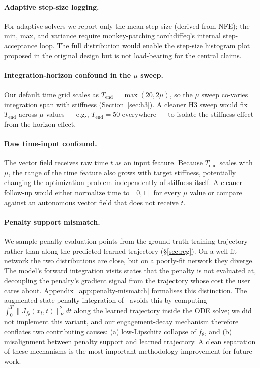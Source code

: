 \documentclass[11pt]{article}
\theoremstyle{plain}
\theoremstyle{definition}
\newcommand{\fjac}{J_{f_\theta}}
\begin{document}
\paragraph{Adaptive step-size logging.}
For adaptive solvers we report only the mean step size (derived from NFE);
the min, max, and variance require monkey-patching torchdiffeq's internal
step-acceptance loop. The full distribution would enable the step-size
histogram plot proposed in the original design but is not load-bearing for
the central claims.

\paragraph{Integration-horizon confound in the $\mu$ sweep.}
Our default time grid scales as $T_\text{end} = \max(20, 2\mu)$, so the
$\mu$ sweep co-varies integration span with stiffness (Section~\ref{sec:h3}).
A cleaner H3 sweep would fix $T_\text{end}$ across $\mu$ values --- e.g.,
$T_\text{end} = 50$ everywhere --- to isolate the stiffness effect from the
horizon effect.

\paragraph{Raw time-input confound.}
The vector field receives raw time $t$ as an input feature. Because
$T_\text{end}$ scales with $\mu$, the range of the time feature also grows with
target stiffness, potentially changing the optimization problem independently
of stiffness itself. A cleaner follow-up would either normalize time to
$[0,1]$ for every $\mu$ value or compare against an autonomous vector field
that does not receive $t$.

\paragraph{Penalty support mismatch.}
We sample penalty evaluation points from the ground-truth training trajectory
rather than along the predicted learned trajectory (\S\ref{sec:reg}). On a
well-fit network the two distributions are close, but on a poorly-fit
network they diverge. The model's forward integration visits states that
the penalty is not evaluated at, decoupling the penalty's gradient signal
from the trajectory whose cost the user cares about. Appendix~\ref{app:penalty-mismatch}
formalises this distinction. The augmented-state penalty integration
of~\citet{finlay2020train} avoids this by computing
$\int_0^T \|\fjac(x_t, t)\|_F^2 dt$ along the learned trajectory inside the
ODE solve; we did not implement this variant, and our engagement-decay
mechanism therefore conflates two contributing causes: (a) low-Lipschitz
collapse of $f_\theta$, and (b) misalignment between penalty support and
learned trajectory. A clean separation of these mechanisms is the most
important methodology improvement for future work.
\end{document}
